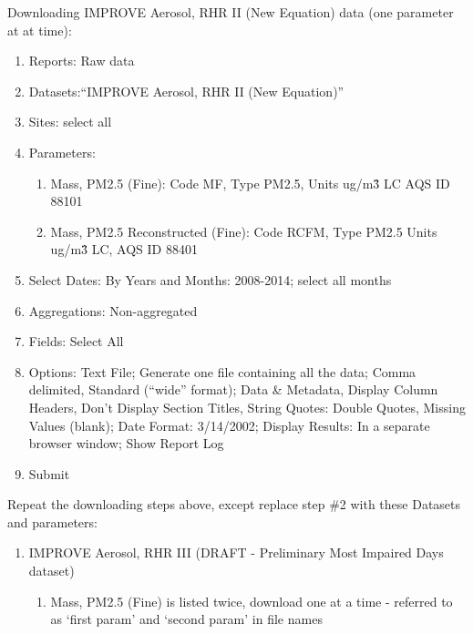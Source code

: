 \noindent Downloading IMPROVE Aerosol, RHR II (New Equation) data (one parameter at at time):
\begin{enumerate}
\item Reports: Raw data
\item Datasets:``IMPROVE Aerosol, RHR II (New Equation)''
\item Sites: select all
\item Parameters: 
  \begin{enumerate}
  \item Mass, PM2.5 (Fine): Code MF, Type PM2.5, Units ug/m\^3 LC AQS ID 88101
  \item Mass, PM2.5 Reconstructed (Fine): Code RCFM, Type PM2.5 Units ug/m\^3 LC, AQS ID 88401
  \end{enumerate}
\item Select Dates: By Years and Months: 2008-2014; select all months
\item Aggregations: Non-aggregated
\item Fields: Select All
\item Options: Text File; Generate one file containing all the data; Comma delimited, Standard (``wide'' format); Data \& Metadata, Display Column Headers, Don't Display Section Titles, String Quotes: Double Quotes, Missing Values (blank); Date Format: 3/14/2002; Display Results: In a separate browser window; Show Report Log
\item Submit
\end{enumerate}

Repeat the downloading steps above, except replace step \#2 with these Datasets and parameters:
\begin{enumerate}
\item IMPROVE Aerosol, RHR III (DRAFT - Preliminary Most Impaired Days dataset) 
	\begin{enumerate}
	\item Mass, PM2.5 (Fine) is listed twice, download one at a time - referred to as `first param' and `second param' in file names
	\end{enumerate}
\end{enumerate}


